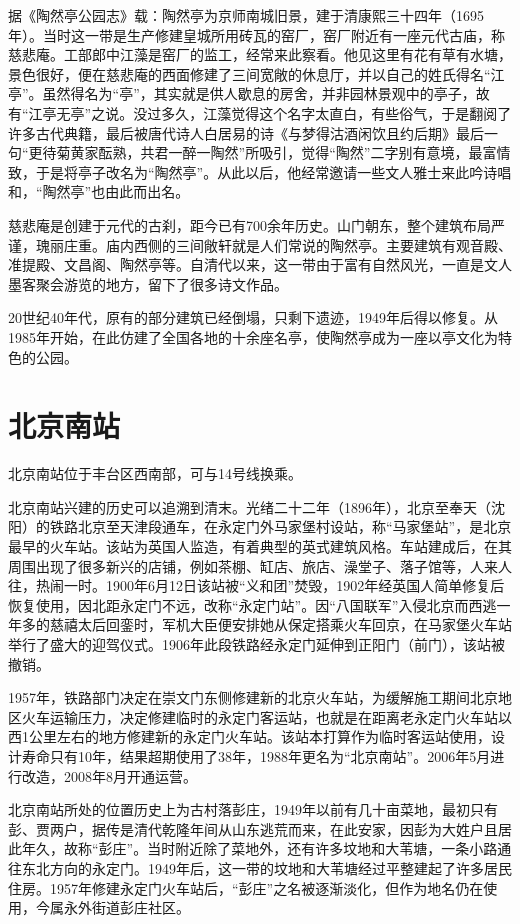 据《陶然亭公园志》载：陶然亭为京师南城旧景，建于清康熙三十四年（1695年）。当时这一带是生产修建皇城所用砖瓦的窑厂，窑厂附近有一座元代古庙，称慈悲庵。工部郎中江藻是窑厂的监工，经常来此察看。他见这里有花有草有水塘，景色很好，便在慈悲庵的西面修建了三间宽敞的休息厅，并以自己的姓氏得名“江亭”。虽然得名为“亭”，其实就是供人歇息的房舍，并非园林景观中的亭子，故有“江亭无亭”之说。没过多久，江藻觉得这个名字太直白，有些俗气，于是翻阅了许多古代典籍，最后被唐代诗人白居易的诗《与梦得沽酒闲饮且约后期》最后一句“更待菊黄家酝熟，共君一醉一陶然”所吸引，觉得“陶然”二字别有意境，最富情致，于是将亭子改名为“陶然亭”。从此以后，他经常邀请一些文人雅士来此吟诗唱和，“陶然亭”也由此而出名。

慈悲庵是创建于元代的古刹，距今已有700余年历史。山门朝东，整个建筑布局严谨，瑰丽庄重。庙内西侧的三间敞轩就是人们常说的陶然亭。主要建筑有观音殿、准提殿、文昌阁、陶然亭等。自清代以来，这一带由于富有自然风光，一直是文人墨客聚会游览的地方，留下了很多诗文作品。

20世纪40年代，原有的部分建筑已经倒塌，只剩下遗迹，1949年后得以修复。从1985年开始，在此仿建了全国各地的十余座名亭，使陶然亭成为一座以亭文化为特色的公园。

\section{北京南站}
北京南站位于丰台区西南部，可与14号线换乘。

北京南站兴建的历史可以追溯到清末。光绪二十二年（1896年），北京至奉天（沈阳）的铁路北京至天津段通车，在永定门外马家堡村设站，称“马家堡站”，是北京最早的火车站。该站为英国人监造，有着典型的英式建筑风格。车站建成后，在其周围出现了很多新兴的店铺，例如茶棚、缸店、旅店、澡堂子、落子馆等，人来人往，热闹一时。1900年6月12日该站被“义和团”焚毁，1902年经英国人简单修复后恢复使用，因北距永定门不远，改称“永定门站”。因“八国联军”入侵北京而西逃一年多的慈禧太后回銮时，军机大臣便安排她从保定搭乘火车回京，在马家堡火车站举行了盛大的迎驾仪式。1906年此段铁路经永定门延伸到正阳门（前门），该站被撤销。

1957年，铁路部门决定在崇文门东侧修建新的北京火车站，为缓解施工期间北京地区火车运输压力，决定修建临时的永定门客运站，也就是在距离老永定门火车站以西1公里左右的地方修建新的永定门火车站。该站本打算作为临时客运站使用，设计寿命只有10年，结果超期使用了38年，1988年更名为“北京南站”。2006年5月进行改造，2008年8月开通运营。

北京南站所处的位置历史上为古村落彭庄，1949年以前有几十亩菜地，最初只有彭、贾两户，据传是清代乾隆年间从山东逃荒而来，在此安家，因彭为大姓户且居此年久，故称“彭庄”。当时附近除了菜地外，还有许多坟地和大苇塘，一条小路通往东北方向的永定门。1949年后，这一带的坟地和大苇塘经过平整建起了许多居民住房。1957年修建永定门火车站后，“彭庄”之名被逐渐淡化，但作为地名仍在使用，今属永外街道彭庄社区。

